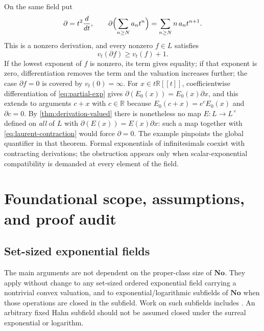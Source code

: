 \documentclass[11pt]{article}
\theoremstyle{definition}
\theoremstyle{remark}
\newcommand{\No}{\mathbf{No}}
\newcommand{\R}{\mathbb{R}}
\numberwithin{equation}{section}
\begin{document}
On the same field put
\begin{equation}\label{eq:laurent-derivation}
 \partial=t^{2}\frac{d}{dt},\qquad
 \partial\Bigl(\sum_{n\ge N}a_nt^{n}\Bigr)=\sum_{n\ge N}n\,a_n t^{n+1}.
\end{equation}
This is a nonzero derivation, and every nonzero $f\in L$ satisfies
\begin{equation}\label{eq:laurent-contraction}
 v_t(\partial f)\ge v_t(f)+1 .
\end{equation}
If the lowest exponent of $f$ is nonzero, its term gives equality; if that
exponent is zero, differentiation removes the term and the valuation
increases further; the case $\partial f=0$ is covered by $v_t(0)=\infty$.
For $x\in t\R[[t]]$, coefficientwise differentiation of \eqref{eq:partial-exp}
gives $\partial(E_0(x))=E_0(x)\partial x$, and this extends to arguments
$c+x$ with $c\in\R$ because $E_0(c+x)=e^{c}E_0(x)$ and $\partial c=0$.
By \cref{thm:derivation-valued} there is nonetheless no map
$E:L\to L^{\times}$ defined on \emph{all} of $L$ with
$\partial(E(x))=E(x)\partial x$: such a map together with
\eqref{eq:laurent-contraction} would force $\partial=0$. The example
pinpoints the global quantifier in that theorem. Formal exponentials of
infinitesimals coexist with contracting derivations; the obstruction
appears only when scalar-exponential compatibility is demanded at every
element of the field.


\section{Foundational scope, assumptions, and proof audit}

\subsection{Set-sized exponential fields}

The main arguments are not dependent on the proper-class size of $\No$.
They apply without change to any set-sized ordered exponential field
carrying a nontrivial convex valuation, and to exponential/logarithmic
subfields of $\No$ when those operations are closed in the subfield.
Work on such subfields includes \cite{EhrlichKaplan,BournezGuilmant}.
An arbitrary fixed Hahn subfield should not be assumed closed under the
surreal exponential or logarithm.
\end{document}
